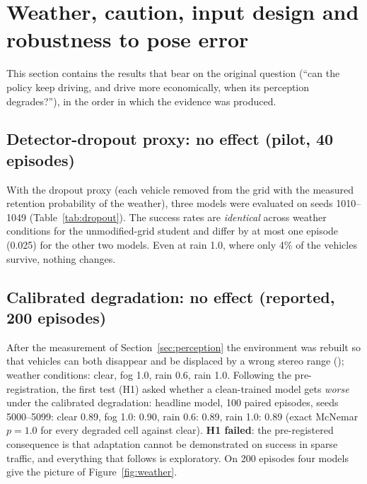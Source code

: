 \section{Weather, caution, input design and robustness to pose error}\label{sec:weather}

This section contains the results that bear on the original question (``can the policy keep driving, and drive more economically, when its perception degrades?''), in the order in which the evidence was produced.

\subsection{Detector-dropout proxy: no effect (pilot, 40 episodes)}
With the dropout proxy (each vehicle removed from the grid with the measured retention probability of the weather), three models were evaluated on seeds 1010--1049 (Table~\ref{tab:dropout}). The success rates are \emph{identical} across weather conditions for the unmodified-grid student and differ by at most one episode (0.025) for the other two models. Even at rain 1.0, where only 4\% of the vehicles survive, nothing changes.
\begin{table}[H]\centering\small
\caption{Success under the detector-dropout proxy, sparse traffic, seeds 1010--1049 (pilot; 40 episodes per cell). ``Share of vehicles kept'' is the measured detector retention used by the proxy.}\label{tab:dropout}
\resizebox{\textwidth}{!}{}
\end{table}

\subsection{Calibrated degradation: no effect (reported, 200 episodes)}
After the measurement of Section~\ref{sec:perception} the environment was rebuilt so that vehicles can both disappear and be displaced by a wrong stereo range (); weather conditions: clear, fog 1.0, rain 0.6, rain 1.0.
Following the pre-registration, the first test (H1) asked whether a clean-trained model gets \emph{worse} under the calibrated degradation: headline model, 100 paired episodes, seeds 5000--5099: clear 0.89, fog 1.0: 0.90, rain 0.6: 0.89, rain 1.0: 0.89 (exact McNemar $p=1.0$ for every degraded cell against clear). \textbf{H1 failed}: the pre-registered consequence is that adaptation cannot be demonstrated on success in sparse traffic, and everything that follows is exploratory.
On 200 episodes four models give the picture of Figure~\ref{fig:weather}.

